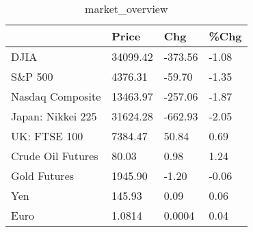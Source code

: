 \documentclass{article}%
\begin{document}
%


\begin{table}[htbp]%
\caption{market\_overview}%
\centering%
\begin{adjustbox}{width=1\textwidth}%
\begin{tabular}{llll}
\toprule
                  &    Price &     Chg &  \%Chg \\
\midrule
             DJIA & 34099.42 & -373.56 & -1.08 \\
          S\&P 500 &  4376.31 &  -59.70 & -1.35 \\
 Nasdaq Composite & 13463.97 & -257.06 & -1.87 \\
Japan: Nikkei 225 & 31624.28 & -662.93 & -2.05 \\
     UK: FTSE 100 &  7384.47 &   50.84 &  0.69 \\
Crude Oil Futures &    80.03 &    0.98 &  1.24 \\
     Gold Futures &  1945.90 &   -1.20 & -0.06 \\
              Yen &   145.93 &    0.09 &  0.06 \\
             Euro &   1.0814 &  0.0004 &  0.04 \\
\bottomrule
\end{tabular}
%
\end{adjustbox}%
\end{table}

%
\end{document}
